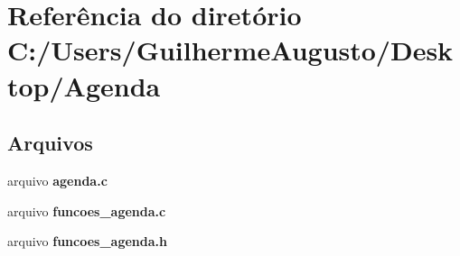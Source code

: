 \section{Referência do diretório C\+:/\+Users/\+Guilherme\+Augusto/\+Desktop/\+Agenda}
\label{dir_53058e5340eb3f471c0e86b3f5abe432}
\subsection*{Arquivos}
\begin{DoxyCompactItemize}
\item 
arquivo {\bf agenda.\+c}
\item 
arquivo {\bf funcoes\+\_\+agenda.\+c}
\item 
arquivo {\bf funcoes\+\_\+agenda.\+h}
\end{DoxyCompactItemize}

